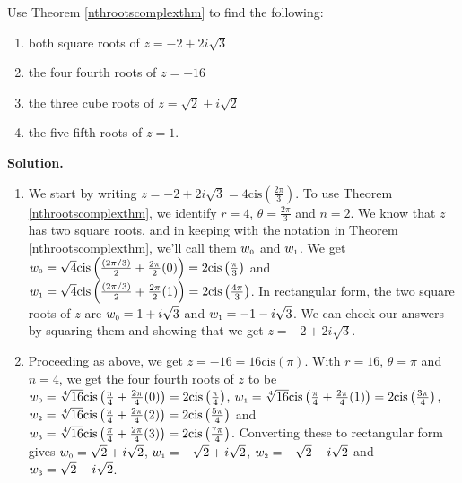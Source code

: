 \begin{ex} \label{nthrootscomplexex}  Use Theorem \ref{nthrootscomplexthm} to find the following:

\begin{enumerate}

\item  both square roots of $z = -2  + 2i\sqrt{3}$

\item  \label{fourthrootsneg16} the four fourth roots of $z = -16$

\item  \label{halfanglecuberoot} the three cube roots of $z = \sqrt{2} + i \sqrt{2}$

\item  \label{calculatorfifthroot} the five fifth roots of $z = 1$.

\end{enumerate}

{\bf Solution.}

\begin{enumerate}

\item  We start by writing $z= - 2 + 2i\sqrt{3} = 4 \text{cis}\left(\frac{2\pi}{3}\right)$.  To use Theorem \ref{nthrootscomplexthm}, we identify $r =4$,  $\theta = \frac{2\pi}{3}$ and $n=2$.  We know that $z$ has two square roots, and in keeping with the notation in Theorem \ref{nthrootscomplexthm}, we'll call them  $w_{\text{\tiny$0$}}$ and $w_{\text{\tiny$1$}}$.  We get $w_{\text{\tiny$0$}} = \sqrt{4} \text{cis}\left(\frac{(2\pi/3)}{2} + \frac{2\pi}{2} (0)\right) = 2\text{cis}\left(\frac{\pi}{3}\right)$ and $w_{\text{\tiny$1$}} = \sqrt{4} \text{cis}\left(\frac{(2\pi/3)}{2} + \frac{2\pi}{2} (1)\right) = 2\text{cis}\left(\frac{4\pi}{3}\right)$.  In rectangular form, the two square roots of $z$ are $w_{\text{\tiny$0$}} = 1+i\sqrt{3}$ and $w_{\text{\tiny$1$}} = -1-i\sqrt{3}$.  We can check our answers by squaring them and showing that we get $z= -2 + 2i\sqrt{3}$.

\item  Proceeding as above, we get $z = -16 = 16 \text{cis}(\pi)$.  With $r = 16$, $\theta = \pi$ and $n = 4$, we get the four fourth roots of $z$ to be  $w_{\text{\tiny$0$}} = \sqrt[4]{16} \text{cis}\left(\frac{\pi}{4} + \frac{2\pi}{4} (0)\right) = 2\text{cis}\left(\frac{\pi}{4}\right)$, $w_{\text{\tiny$1$}} = \sqrt[4]{16} \text{cis}\left(\frac{\pi}{4} + \frac{2\pi}{4} (1)\right) = 2\text{cis}\left(\frac{3\pi}{4}\right)$, $w_{\text{\tiny$2$}} = \sqrt[4]{16} \text{cis}\left(\frac{\pi}{4} + \frac{2\pi}{4} (2)\right) = 2\text{cis}\left(\frac{5\pi}{4}\right)$ and $w_{\text{\tiny$3$}} = \sqrt[4]{16} \text{cis}\left(\frac{\pi}{4} + \frac{2\pi}{4} (3)\right) = 2\text{cis}\left(\frac{7\pi}{4}\right)$.  Converting these to rectangular form gives $w_{\text{\tiny$0$}} = \sqrt{2} + i\sqrt{2}$,  $w_{\text{\tiny$1$}} = -\sqrt{2} + i\sqrt{2}$,  $w_{\text{\tiny$2$}} = -\sqrt{2} - i\sqrt{2}$ and  $w_{\text{\tiny$3$}} = \sqrt{2} - i\sqrt{2}$.


\end{enumerate}
\end{ex}
